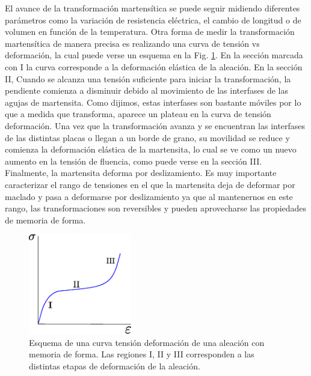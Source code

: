 \documentclass[a4paper,12pt,fleqn,twoside,openany]{book}
\begin{document}
El avance de la transformación martensítica se puede seguir midiendo diferentes parámetros como la variación de resistencia eléctrica, 
el cambio de longitud o de volumen en función de la temperatura. Otra forma de medir la transformación martensítica de manera precisa es realizando 
una curva de tensión vs deformación, la cual puede verse un esquema en la Fig. \ref{fig:TensDefSMA}. En la sección marcada con I la curva 
corresponde a la deformación elástica de la aleación. En la sección II, Cuando se alcanza una tensión 
suficiente para iniciar la transformación, la pendiente comienza a disminuir debido al movimiento de las interfases de las agujas de martensita. 
Como dijimos, estas interfases son bastante móviles por lo que a medida que transforma, aparece un plateau en la curva de tensión deformación. 
Una vez que la transformación avanza y se encuentran las interfases de las distintas placas o llegan a un borde de grano, su movilidad se reduce y 
comienza la deformación elástica de la martensita, lo cual se ve como un nuevo aumento en la tensión de fluencia, como puede verse en la sección III. 
Finalmente, la martensita deforma por deslizamiento. Es muy importante caracterizar el rango de tensiones en el que la martensita deja de deformar 
por maclado y pasa a 
deformarse por deslizamiento ya que al mantenernos en este rango, las transformaciones son reversibles y pueden aprovecharse las propiedades de 
memoria de forma.

\begin{figure}[h]
 \centering
 \includegraphics[width=0.4\textwidth]{SigmavsDef.eps}
 \caption{Esquema de una curva tensión deformación de una aleación con memoria de forma. Las regiones I, II y III corresponden a las distintas etapas 
 de deformación de la aleación.}
 \label{fig:TensDefSMA}
 \end{figure}
\end{document}
